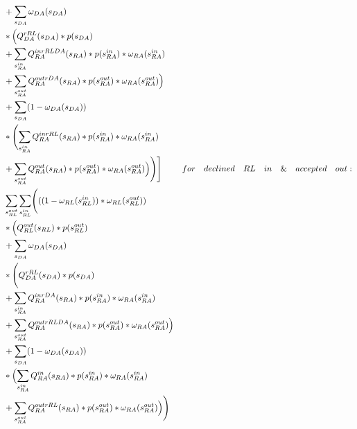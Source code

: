 \documentclass{article}
\begin{document}
\begin{equation}
    \begin{split}
    & + \sum_{s_{DA}}\omega_{DA}(s_{DA}) \\
        & * \Bigl(Q^{rRL}_{DA}(s_{DA}) * p(s_{DA}) \\
	& + \sum_{s^{in}_{RA}} Q^{inrRLDA}_{RA}(s_{RA}) * p(s^{in}_{RA}) * \omega_{RA}(s^{in}_{RA})\\
	& + \sum_{s^{out}_{RA}} Q^{outrDA}_{RA}(s_{RA}) * p(s^{out}_{RA}) * \omega_{RA}(s^{out}_{RA})\Bigr)\\
    & + \sum_{s_{DA}}(1-\omega_{DA}(s_{DA})) \\
        & * \Biggl( \sum_{s^{in}_{RA}} Q^{inrRL}_{RA}(s_{RA}) * p(s^{in}_{RA}) * \omega_{RA}(s^{in}_{RA})\\
	& + \sum_{s^{out}_{RA}} Q^{out}_{RA}(s_{RA}) * p(s^{out}_{RA}) * \omega_{RA}(s^{out}_{RA})\Bigr) \Biggr)\Biggr]
&for\quad declined\quad RL\quad in\quad \& \quad accepted\quad out:\\
         &\sum_{s^{out}_{RL}}\sum_{s^{in}_{RL}} \Biggl( ((1-\omega_{RL}(s^{in}_{RL}))*\omega_{RL}(s^{out}_{RL}))\\
        &*\Bigl(Q^{out}_{RL}(s_{RL}) * p(s^{out}_{RL})\\
    & + \sum_{s_{DA}}\omega_{DA}(s_{DA}) \\
        & * \Biggl(Q^{rRL}_{DA}(s_{DA}) * p(s_{DA}) \\
	& + \sum_{s^{in}_{RA}} Q^{inrDA}_{RA}(s_{RA}) * p(s^{in}_{RA}) * \omega_{RA}(s^{in}_{RA})\\
	& + \sum_{s^{out}_{RA}} Q^{outrRLDA}_{RA}(s_{RA}) * p(s^{out}_{RA}) * \omega_{RA}(s^{out}_{RA})\Bigr)\\
    & + \sum_{s_{DA}}(1-\omega_{DA}(s_{DA})) \\
        & * \Bigl(\sum_{s^{in}_{RA}} Q^{in}_{RA}(s_{RA}) * p(s^{in}_{RA}) * \omega_{RA}(s^{in}_{RA})\\
	& + \sum_{s^{out}_{RA}} Q^{outrRL}_{RA}(s_{RA}) * p(s^{out}_{RA}) * \omega_{RA}(s^{out}_{RA})\Bigr) \Biggr)
    \end{split}
\end{equation}
\end{document}
